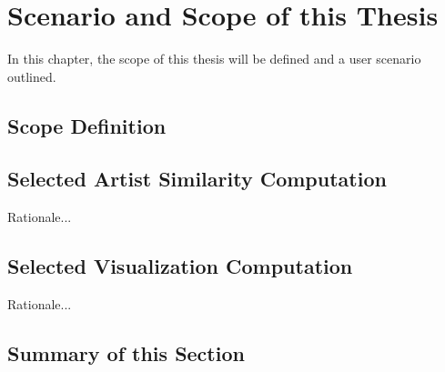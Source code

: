 \section{Scenario and Scope of this Thesis}

In this chapter, the scope of this thesis will be defined and a user scenario outlined. 

\subsection{Scope Definition}

\subsection{Selected Artist Similarity Computation}

Rationale...

\subsection{Selected Visualization Computation}

Rationale...

\subsection{Summary of this Section}